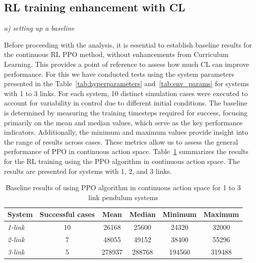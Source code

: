 \subsection{RL training enhancement with CL} \label{subsec: RL training enhancement with CL}

\textit{a) setting up a baseline}

Before proceeding with the analysis, it is essential to establish baseline results for the continuous RL PPO method, without enhancements from Curriculum Learning. This provides a point of reference to assess how much CL can improve performance. For this we have conducted tests using the system parameters presented in the Table~\ref{tab:hyperparameters} and~\ref{tab:env_params} for systems with 1 to 3 links. For each system, 10 distinct simulation cases were executed to account for variability in control due to different initial conditions. The baseline is determined by measuring the training timesteps required for success, focusing primarily on the mean and median values, which serve as the key performance indicators. Additionally, the minimum and maximum values provide insight into the range of results across cases. These metrics allow us to assess the general performance of PPO in continuous action space. Table~\ref{tab: baseline statistics for PPO in continuous action space} summarizes the results for the RL training using the PPO algorithm in continuous action space. The results are presented for systems with 1, 2, and 3 links.

\begin{table}[ht]
	\centering
	\caption{Baseline results of using PPO algorithm in continuous action space for 1 to 3 link pendulum systems}
	\begin{tabular}{@{}lccccc@{}}
		\toprule
		\textbf{System} & \textbf{Successful cases} & \textbf{Mean} & \textbf{Median} & \textbf{Minimum} & \textbf{Maximum} \\ \midrule
		\textit{1-link} & 10 & 26168 & 25600 & 24320 & 32000 \\
		\textit{2-link} & 7 & 48055 & 49152 & 38400 & 55296 \\
		\textit{3-link} & 5 & 278937 & 288768 & 194560 & 319488 \\ \bottomrule
	\end{tabular}
	\label{tab: baseline statistics for PPO in continuous action space}
\end{table}


